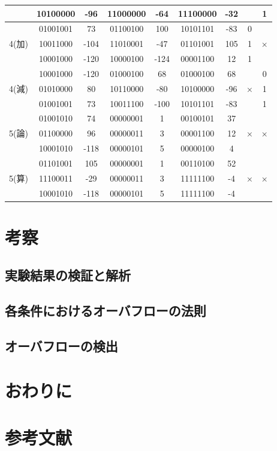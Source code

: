 \documentclass[11pt,a4j]{jsarticle}
\begin{document}
\begin{table}[htb]
\begin{center}
\begin{tabular}{|c|c|c|c|c|c|c|c|c|}
 & 10100000 & -96 & 11000000 & -64 &11100000  &-32  &  & 1 \\ \hline
 &01001001  & 73 &01100100  & 100 & 10101101 & -83 & 0 &  \\ \cline{2-8}
4(加) &  10011000& -104 & 11010001 & -47 & 01101001 &105  & 1 & × \\ \cline{2-8}
 &  10001000&-120  &  10000100& -124 &00001100  & 12 & 1 &  \\ \hline
 &10001000  & -120 & 01000100 & 68 &01000100  & 68 &  & 0 \\ \cline{2-7}\cline{9-9}
4(減) &01010000  & 80 & 10110000 & -80 & 10100000 & -96 & × & 1 \\ \cline{2-7}\cline{9-9}
 &01001001  &73  & 10011100 & -100 &10101101  &-83  &  & 1 \\ \hline
 & 01001010 &74  &00000001  &1  &00100101  & 37 &  &  \\ \cline{2-7}
5(論) &01100000  & 96 & 00000011 & 3 &00001100  &12  & × & × \\ \cline{2-7}
 & 10001010 &-118  & 00000101 &5  & 00000100 &4  &  &  \\ \hline
 &01101001  &105  &00000001  & 1 &00110100  &52  &  &  \\ \cline{2-7}
5(算) & 11100011 & -29 & 00000011 &3  &11111100  &-4  & × & × \\ \cline{2-7}
 & 10001010 & -118 &00000101  & 5 & 11111100 &-4  &  &  \\ \hline
    \end{tabular}
    \label{tab:1kadai}
  \end{center}
 \end{table}
 
 
 
  
 \section{考察}
  
   \subsection{実験結果の検証と解析}
   
   
   \subsection{各条件におけるオーバフローの法則}
   
   
   \subsection{オーバフローの検出}
   
   
   
  
  
 \section{おわりに}
  
  
  
 \section{参考文献}
  
  
  
\end{document}
